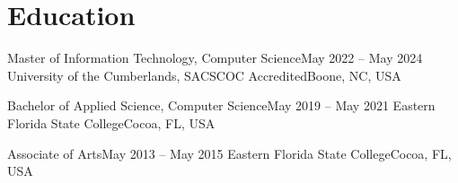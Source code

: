 \section{Education}
\mySubHeadingListStart

  \mySubHeading
    {Master of Information Technology, Computer Science}{May 2022 -- May 2024}
    {University of the Cumberlands, SACSCOC Accredited}{Boone, NC, USA}

  \mySubHeading
    {Bachelor of Applied Science, Computer Science}{May 2019 -- May 2021}
    {Eastern Florida State College}{Cocoa, FL, USA}
    \myItemListStart
    \myItemListEnd

  \mySubHeading
    {Associate of Arts}{May 2013 -- May 2015}
    {Eastern Florida State College}{Cocoa, FL, USA}

\mySubHeadingListEnd
